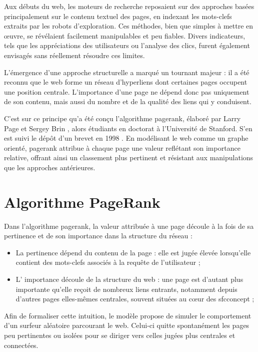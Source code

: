\documentclass[conference]{IEEEtran}
\begin{document}
Aux débuts du web, les moteurs de recherche reposaient sur des approches basées principalement sur le contenu textuel des pages, en indexant les mots-clefs extraits par les robots d'exploration. 
Ces méthodes, bien que simples à mettre en œuvre, se révélaient facilement manipulables et peu fiables. 
Divers indicateurs, tels que les appréciations des utilisateurs ou l'analyse des clics, furent également envisagés sans réellement résoudre ces limites.  

L'émergence d'une approche structurelle a marqué un tournant majeur : il a été reconnu que le web forme un réseau d'hyperliens dont certaines pages occupent une position centrale.
L'importance d'une page ne dépend donc pas uniquement de son contenu, mais aussi du nombre et de la qualité des liens qui y conduisent.  

C'est sur ce principe qu'a été conçu l'algorithme \gls{pagerank}, élaboré par Larry Page et Sergey Brin \cite{page1998anatomy}, alors étudiants en doctorat à l'Université de Stanford. S'en est suivi le dépôt d'un brevet en 1998 \cite{Page2001}.
En modélisant le web comme un graphe orienté, \gls{pagerank} attribue à chaque page une valeur reflétant son importance relative, offrant ainsi un classement plus pertinent et résistant aux manipulations que les approches antérieures.

\section{Algorithme PageRank}

Dans l'algorithme \gls{pagerank}, la valeur attribuée à une page découle à la fois de sa \og pertinence \fg{} et de son \og importance \fg{} dans la structure du réseau :

\begin{itemize}
    \item La \og pertinence \fg{} dépend du contenu de la page : elle est jugée élevée lorsqu'elle contient des mots-clefs associés à la requête de l'utilisateur ;
    \item L' \og importance \fg{} découle de la structure du web : une page est d'autant plus importante qu'elle reçoit de nombreux liens entrants, notamment depuis d'autres pages elles-mêmes centrales, souvent situées au cœur des \gls{sfcconcept} ;
\end{itemize}

Afin de formaliser cette intuition, le modèle propose de simuler le comportement d'un \og surfeur aléatoire \fg{} parcourant le web. Celui-ci quitte spontanément les pages peu pertinentes ou isolées pour se diriger vers celles jugées plus centrales et connectées.  
\end{document}
